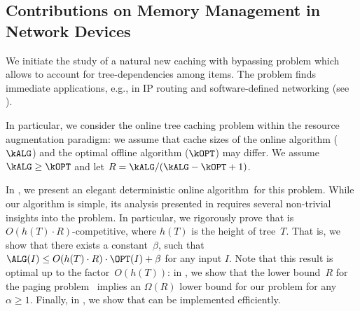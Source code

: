 \subsection{Contributions on Memory Management in Network Devices}


We initiate the study of a natural new caching with bypassing problem which
allows to account for tree-dependencies among items. The problem finds
immediate applications, e.g., in IP routing and software-defined networking
(see ).

In particular, we consider the online tree caching problem within the resource
augmentation paradigm: we assume that cache sizes of the online algorithm
($\kALG$)  and the optimal offline algorithm ($\kOPT$) may differ. We assume
$\kALG \geq \kOPT$ and let $R = \kALG/(\kALG-\kOPT+1)$.

In , we present an elegant deterministic online
algorithm~\ALG for this problem. While our algorithm is simple, its analysis
presented in  requires several non-trivial
insights into the problem. In particular, we rigorously prove that \ALG is
$O(h(T) \cdot R)$-competitive, where $h(T)$ is the height of tree~$T$. That
is, we show that there exists a constant~$\beta$, such that $\ALG(I) \leq
O(h(T) \cdot R) \cdot \OPT(I) + \beta$ for any input $I$. Note that this
result is optimal up to the factor~$O(h(T))$: in
, we show that the lower
bound~$R$ for the paging problem~\cite{competitive-analysis} implies an
$\Omega(R)$ lower bound for our problem for any $\alpha \geq 1$. Finally, in
, we show that \ALG can be
implemented efficiently.

